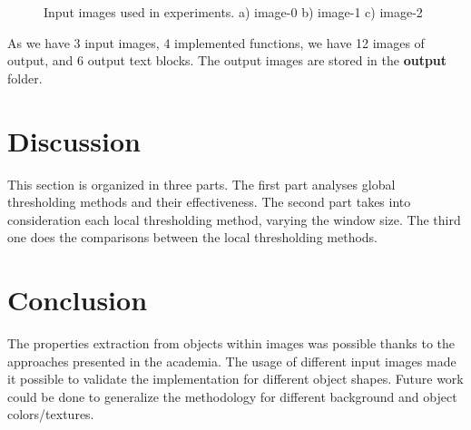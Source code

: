 \documentclass[]{IEEEtran}
\begin{document}
\begin{figure}[H]
  \centering
  \caption{Input images used in experiments. a) image-0 b) image-1 c) image-2}
  \label{fig:input-images}
\end{figure}

As we have 3 input images, 4 implemented functions, we have 12 images of output, and 6 output text blocks. The output images are stored in the \textbf{output} folder.

\section{Discussion}
This section is organized in three parts. The first part analyses global thresholding methods and their effectiveness. The second part takes into consideration each local thresholding method, varying the window size. The third one does the comparisons between the local thresholding methods.

\section{Conclusion}
The properties extraction from objects within images was possible thanks to the approaches presented in the academia.
The usage of different input images made it possible to validate the implementation for different object shapes. Future work could be done to generalize the methodology for different background and object colors/textures. 



\end{document}
